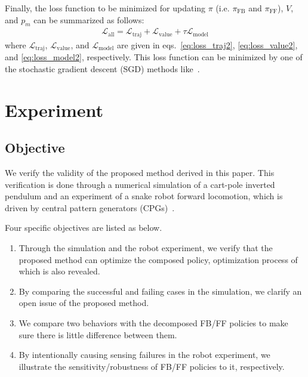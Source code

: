 \documentclass{bmcart}
\begin{document}
Finally, the loss function to be minimized for updating $\pi$ (i.e. $\pi_\mathrm{FB}$ and $\pi_\mathrm{FF}$), $V$, and $p_m$ can be summarized as follows:
\begin{align}
    \mathcal{L}_\mathrm{all} = \mathcal{L}_\mathrm{traj} + \mathcal{L}_\mathrm{value} + \tau \mathcal{L}_\mathrm{model}
    \label{eq:loss_all}
\end{align}
where $\mathcal{L}_\mathrm{traj}$, $\mathcal{L}_\mathrm{value}$, and $\mathcal{L}_\mathrm{model}$ are given in eqs.~\eqref{eq:loss_traj2}, \eqref{eq:loss_value2}, and \eqref{eq:loss_model2}, respectively.
This loss function can be minimized by one of the stochastic gradient descent (SGD) methods like~\cite{ziyin2020laprop}.

\section{Experiment}

\subsection{Objective}

We verify the validity of the proposed method derived in this paper.
This verification is done through a numerical simulation of a cart-pole inverted pendulum and an experiment of a snake robot forward locomotion, which is driven by central pattern generators (CPGs)~\cite{cohen1982nature}.

Four specific objectives are listed as below.
\begin{enumerate}
    \item Through the simulation and the robot experiment, we verify that the proposed method can optimize the composed policy, optimization process of which is also revealed.
    \item By comparing the successful and failing cases in the simulation, we clarify an open issue of the proposed method.
    \item We compare two behaviors with the decomposed FB/FF policies to make sure there is little difference between them.
    \item By intentionally causing sensing failures in the robot experiment, we illustrate the sensitivity/robustness of FB/FF policies to it, respectively.
\end{enumerate}
\end{document}
